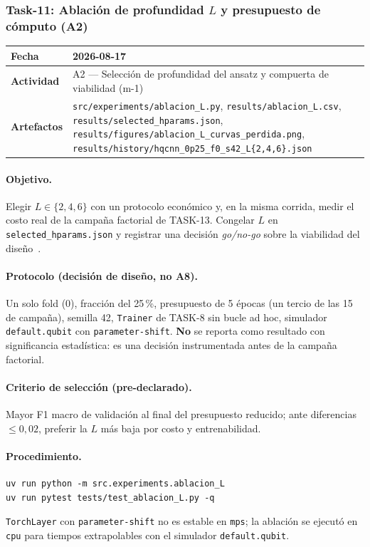 \subsubsection{Task-11: Ablación de profundidad $L$ y presupuesto de cómputo (A2)}
\label{hallazgo:task-11}
\begin{tabularx}{\textwidth}{|l|X|}\hline
\textbf{Fecha} & 2026-08-17 \\\hline
\textbf{Actividad} & A2 --- Selección de profundidad del ansatz y compuerta de viabilidad (m-1) \\\hline
\textbf{Artefactos} & \texttt{src/experiments/ablacion\_L.py}, \texttt{results/ablacion\_L.csv}, \texttt{results/selected\_hparams.json}, \texttt{results/figures/ablacion\_L\_curvas\_perdida.png}, \texttt{results/history/hqcnn\_0p25\_f0\_s42\_L\{2,4,6\}.json} \\\hline
\end{tabularx}

\paragraph{Objetivo.}
Elegir $L \in \{2, 4, 6\}$ con un protocolo económico y, en la misma corrida, medir
el costo real de la campaña factorial de TASK-13. Congelar $L$ en
\texttt{selected\_hparams.json} y registrar una decisión \textit{go/no-go} sobre la
viabilidad del diseño~\cite{holmes2022connecting,McClean2018B,caro2022generalization}.

\paragraph{Protocolo (decisión de diseño, no A8).}
Un solo fold (0), fracción del 25\,\%, presupuesto de 5 épocas (un tercio de las 15
de campaña), semilla 42, \texttt{Trainer} de TASK-8 sin bucle ad hoc, simulador
\texttt{default.qubit} con \texttt{parameter-shift}. \textbf{No} se reporta como
resultado con significancia estadística: es una decisión instrumentada antes de la
campaña factorial.

\paragraph{Criterio de selección (pre-declarado).}
Mayor F1 macro de validación al final del presupuesto reducido; ante diferencias
$\leq 0{,}02$, preferir la $L$ más baja por costo y entrenabilidad.

\paragraph{Procedimiento.}
\begin{verbatim}
uv run python -m src.experiments.ablacion_L
uv run pytest tests/test_ablacion_L.py -q
\end{verbatim}
\texttt{TorchLayer} con \texttt{parameter-shift} no es estable en \texttt{mps}; la
ablación se ejecutó en \texttt{cpu} para tiempos extrapolables con el simulador
\texttt{default.qubit}.

